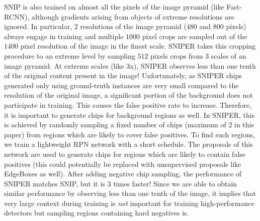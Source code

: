 \documentclass{article}
\begin{document}

SNIP \cite{singh2017analysis} is also trained on almost all the pixels of the image pyramid (like Fast-RCNN), although gradients arising from objects of extreme resolutions are ignored. In particular, $2$ resolutions of the image pyramid ($480$ and $800$ pixels) always engage in training and multiple $1000$ pixel crops are sampled out of the $1400$ pixel resolution of the image in the finest scale. SNIPER takes this cropping procedure to an extreme level by sampling $512$ pixels crops from $3$ scales of an image pyramid. At extreme scales (like $3$x), SNIPER observes less than one tenth of the original content present in the image! Unfortunately, as SNIPER chips generated only using ground-truth instances are very small compared to the resolution of the original image, a significant portion of the background does not participate in training. This causes the false positive rate to increase. Therefore, it is important to generate chips for background regions as well. In SNIPER, this is achieved by randomly sampling a fixed number of chips (maximum of $2$ in this paper) from regions which are likely to cover false positives. To find such regions, we train a lightweight RPN network with a short schedule. The proposals of this network are used to generate chips for regions which are likely to contain false positives (this could potentially be replaced with unsupervised proposals like EdgeBoxes \cite{zitnick2014edge} as well). After adding negative chip sampling, the performance of SNIPER matches SNIP, but it is $3$ times faster! Since we are able to obtain similar performance by observing less than one tenth of the image, it implies that very large context during training is {\em not} important for training high-performance detectors but sampling regions containing hard negatives is. 
\end{document}
